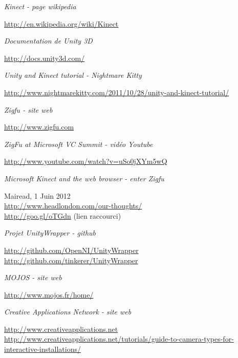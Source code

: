 \begin{thebibliography}{200}
\begin{footnotesize}
  \emph{Kinect - page wikipedia}\\
  \begin{tiny}
  \url{http://en.wikipedia.org/wiki/Kinect}
  \end{tiny}
  
  \emph{Documentation de Unity 3D}\\
  \begin{tiny}
  \url{http://docs.unity3d.com/}
  \end{tiny}
  
  \emph{Unity and Kinect tutorial - Nightmare Kitty}\\
  \begin{tiny}
  \url{http://www.nightmarekitty.com/2011/10/28/unity-and-kinect-tutorial/}
  \end{tiny}

  \emph{Zigfu - site web}\\
  \begin{tiny}
  \url{http://www.zigfu.com}
  \end{tiny}

  \emph{ZigFu at Microsoft VC Summit - vidéo Youtube}\\
  \begin{tiny}
  \url{http://www.youtube.com/watch?v=uSo0jXYm5wQ}
  \end{tiny}
  
  \emph{Microsoft Kinect and the web browser - enter Zigfu}\\
  \begin{tiny}
  Mairead, 1 Juin 2012\\
  \url{http://www.headlondon.com/our-thoughts/}\\
  \url{http://goo.gl/oTGdn} (lien raccourci)
  \end{tiny}
  
  \emph{Projet UnityWrapper - github}\\
  \begin{tiny}
  \url{http://github.com/OpenNI/UnityWrapper}\\
  \url{http://github.com/tinkerer/UnityWrapper}
  \end{tiny}
  
  \emph{MOJOS - site web}\\
  \begin{tiny}
  \url{http://www.mojos.fr/home/}
  \end{tiny}

  \emph{Creative Applications Network - site web}\\
  \begin{tiny}
  \url{http://www.creativeapplications.net}
  \url{http://www.creativeapplications.net/tutorials/guide-to-camera-types-for-interactive-installations/}
  \end{tiny}
  
\end{footnotesize}
\end{thebibliography}
